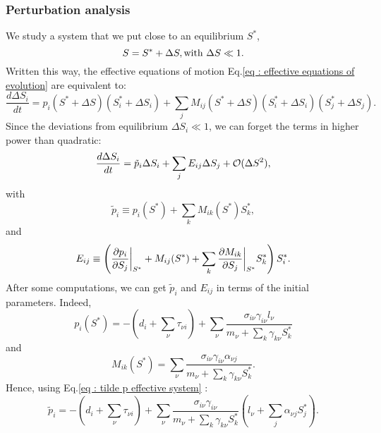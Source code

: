 \documentclass[12pt]{report}
\begin{document}
\subsubsection{Perturbation analysis}
We study a system that we put close to an equilibrium $S^*$, \ie
\begin{equation}
S=S^*+\Delta S, \\ \text{with } \Delta S \ll 1.
\end{equation}
Written this way, the effective equations of motion Eq.\eqref{eq : effective equations of evolution} are equivalent to:
\begin{equation}
\frac{d\Delta S_i}{dt} = p_i(S^*+\Delta S)\left(S^*_i + \Delta S_i\right)+\sum_j M_{ij}(S^*+\Delta S)\left(S^*_i +\Delta S_i\right)\left(S^*_j +\Delta S_j\right).
\end{equation}
Since the deviations from equilibrium $\Delta S_i \ll 1$, we can forget the terms in higher power than quadratic:
\begin{equation}
\frac{d\Delta S_i}{dt} = \tilde{p}_i \Delta S_i + \sum_j E_{ij} \Delta S_j + \mathcal{O}(\Delta S^2),\label{eq : effective equ evol at O(D2)}
\end{equation}
with
\begin{equation}
\tilde{p}_i \equiv p_i(S^*) + \sum_k M_{ik}(S^*)S_k^*, \label{eq : tilde p effective system}
\end{equation}
and
\begin{equation}
E_{ij} \equiv \left(\dfrac{\partial p_i}{\partial S_j}\bigg\rvert_{S^*}+M_{ij}(S^*)+\sum_k \dfrac{\partial M_{ik}}{\partial S_j}\bigg\rvert_{S^*}S^*_k\right)S^*_i.
\end{equation}
After some computations, we can get $\tilde{p}_i$ and $E_{ij}$ in terms of the initial parameters. Indeed,
\begin{equation}
p_i(S^*)= -\left(d_i + \sum_\nu \tau_{\nu i}\right) + \sum_\nu \frac{\sigma_{i\nu}\gamma_{i\nu}l_\nu}{m_\nu + \sum_k \gamma_{k\nu}S^*_k}
\end{equation}
and
\begin{equation}
M_{ik}(S^*) = \sum_\nu \frac{\sigma_{i\nu}\gamma_{i\nu}\alpha_{\nu j}}{m_\nu + \sum_k \gamma_{k\nu}S^*_k}.
\end{equation}
Hence, using Eq.\eqref{eq : tilde p effective system} :
\begin{equation}
\tilde{p}_i = - \left(d_i + \sum_\nu \tau_{\nu i}\right) + \sum_\nu \frac{\sigma_{i\nu}\gamma_{i\nu}}{m_\nu + \sum_k \gamma_{k\nu}S^*_k}\left(l_\nu+\sum_{j}\alpha_{\nu j} S^*_j\right).
\end{equation}
\end{document}

